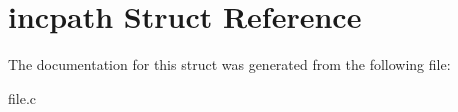 \hypertarget{structincpath}{\section{incpath Struct Reference}
\label{structincpath}
}


The documentation for this struct was generated from the following file\-:\begin{DoxyCompactItemize}
\item 
file.\-c\end{DoxyCompactItemize}
